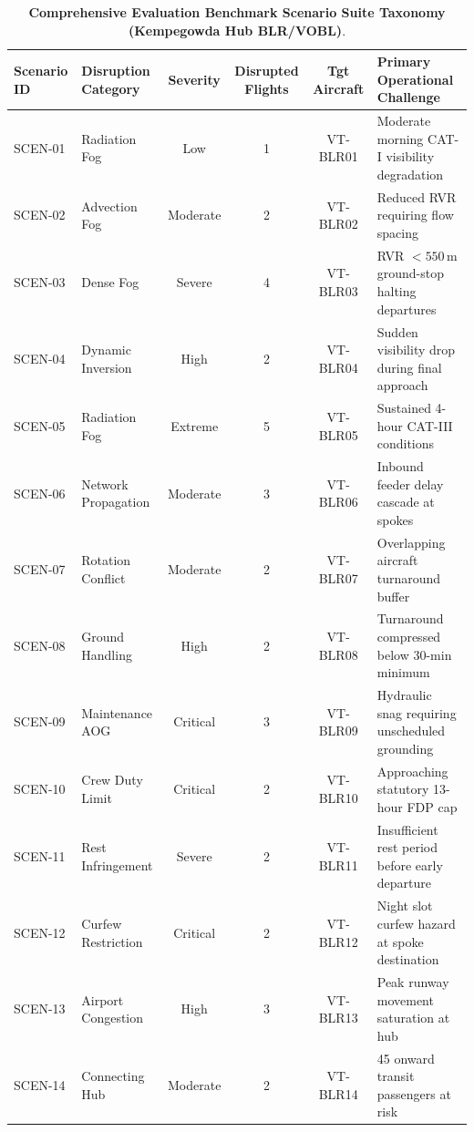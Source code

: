 
\begin{table}[htbp]
\centering
\small
\caption{\textbf{Comprehensive Evaluation Benchmark Scenario Suite Taxonomy (Kempegowda Hub BLR/VOBL)}.}
\label{tab:scenario_taxonomy}
\begin{tabular}{@{}llcccl@{}}
\toprule
\textbf{Scenario ID} & \textbf{Disruption Category} & \textbf{Severity} & \textbf{Disrupted Flights} & \textbf{Tgt Aircraft} & \textbf{Primary Operational Challenge} \\
\midrule
SCEN-01 & Radiation Fog & Low & 1 & VT-BLR01 & Moderate morning CAT-I visibility degradation \\
SCEN-02 & Advection Fog & Moderate & 2 & VT-BLR02 & Reduced RVR requiring flow spacing \\
SCEN-03 & Dense Fog & Severe & 4 & VT-BLR03 & RVR $<550\,$m ground-stop halting departures \\
SCEN-04 & Dynamic Inversion & High & 2 & VT-BLR04 & Sudden visibility drop during final approach \\
SCEN-05 & Radiation Fog & Extreme & 5 & VT-BLR05 & Sustained 4-hour CAT-III conditions \\
SCEN-06 & Network Propagation & Moderate & 3 & VT-BLR06 & Inbound feeder delay cascade at spokes \\
SCEN-07 & Rotation Conflict & Moderate & 2 & VT-BLR07 & Overlapping aircraft turnaround buffer \\
SCEN-08 & Ground Handling & High & 2 & VT-BLR08 & Turnaround compressed below 30-min minimum \\
SCEN-09 & Maintenance AOG & Critical & 3 & VT-BLR09 & Hydraulic snag requiring unscheduled grounding \\
SCEN-10 & Crew Duty Limit & Critical & 2 & VT-BLR10 & Approaching statutory 13-hour FDP cap \\
SCEN-11 & Rest Infringement & Severe & 2 & VT-BLR11 & Insufficient rest period before early departure \\
SCEN-12 & Curfew Restriction & Critical & 2 & VT-BLR12 & Night slot curfew hazard at spoke destination \\
SCEN-13 & Airport Congestion & High & 3 & VT-BLR13 & Peak runway movement saturation at hub \\
SCEN-14 & Connecting Hub & Moderate & 2 & VT-BLR14 & 45 onward transit passengers at risk \\

\end{tabular}
\end{table}

